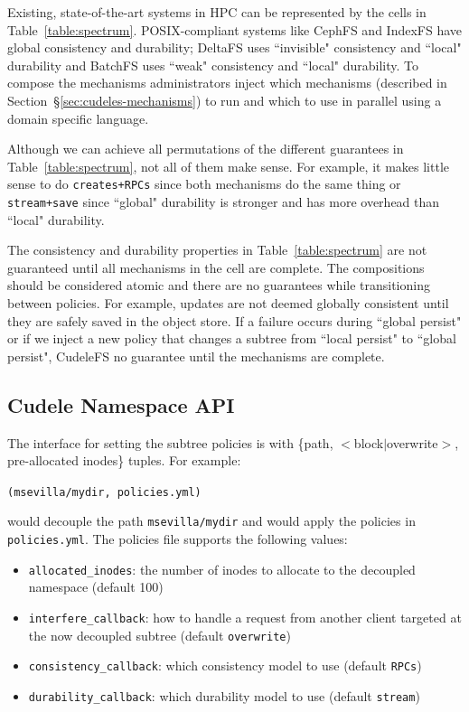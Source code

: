 Existing, state-of-the-art systems in HPC can be represented by the cells in
Table~\ref{table:spectrum}.  POSIX-compliant systems like CephFS and IndexFS
have global consistency and durability; DeltaFS uses ``invisible" consistency
and ``local" durability and BatchFS uses ``weak" consistency and ``local"
durability.  To compose the mechanisms administrators inject which mechanisms
(described in Section~\S\ref{sec:cudeles-mechanisms}) to run and which to use
in parallel using a domain specific language. 

Although we can achieve all permutations of the different guarantees in
Table~\ref{table:spectrum}, not all of them make sense. For example, it
makes little sense to do \texttt{creates+RPCs} since both mechanisms do the same
thing or \texttt{stream+save} since ``global" durability is stronger and has
more overhead than ``local" durability. 

The consistency and durability properties in Table~\ref{table:spectrum} are not
guaranteed until all mechanisms in the cell are complete. The compositions
should be considered atomic and there are no guarantees while transitioning
between policies. For example, updates are not deemed globally consistent until
they are safely saved in the object store. If a failure occurs during ``global
persist" or if we inject a new policy that changes a subtree from ``local
persist" to ``global persist", CudeleFS no guarantee until the mechanisms are
complete.

\subsection{Cudele Namespace API}
\label{sec:cudele-namespace-api}

The interface for setting the subtree policies is with \{path,
\(<\)block\(|\)overwrite\(>\), pre-allocated inodes\} tuples. For example:

\texttt{(msevilla/mydir, policies.yml)}

would decouple the path \texttt{msevilla/mydir} and would apply the policies in
\texttt{policies.yml}. The policies file supports the following values:

\begin{itemize}

  \item \texttt{allocated\_inodes}: the number of inodes to allocate to the
  decoupled namespace (default 100)

  \item \texttt{interfere\_callback}: how to handle a request from another
  client targeted at the now decoupled subtree (default \texttt{overwrite})

  \item \texttt{consistency\_callback}: which consistency model to use (default
  \texttt{RPCs})

  \item \texttt{durability\_callback}: which durability model to use (default
  \texttt{stream})

\end{itemize}

